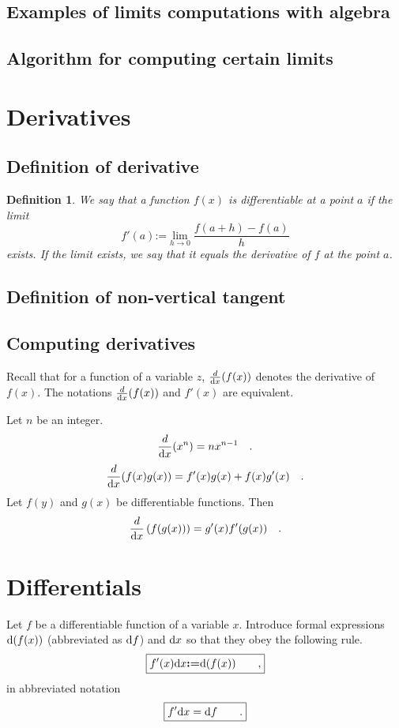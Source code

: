 \documentclass[12pt]{book}
\newcommand{\eqdef}{\textbf{:=}}
\newcommand{\importantFormula}[1]{\begin{equation} \boxed{#1} \end{equation}}
\newtheorem{definition}[theorem]{Definition}
\begin{document}
\subsection{Examples of limits computations with algebra}



\subsection{Algorithm for computing certain limits}


\section{Derivatives}

\subsection{Definition of derivative}\label{secDerivative}
\begin{definition}
We say that a function $f(x)$ is differentiable at a point $a$ if the limit
\begin{equation}\label{eqDefDerivative}
f'(a)\eqdef \lim_{h\to 0} \frac{f(a+h)-f(a)}{h}
\end{equation}
exists. If the limit exists, we say that it equals the derivative of $f$ at the point $a$.
\end{definition}

\subsection{Definition of non-vertical tangent}
\label{secDefTangent}

\subsection{Computing derivatives}
Recall that for a function of a variable $z$, $\frac{d}{{\normalfont \text{d}} x}(f(x))$ denotes the derivative of $f(x)$. The notations $\frac{d}{{\normalfont \text{d}} x}(f(x))$ and $f'(x)$ are equivalent.

Let $n$ be an integer.
\[
\frac{d}{{\normalfont \text{d}} x} (x^n)= n x^{n-1}\quad .
\]
\[
\frac{d}{{\normalfont \text{d}} x} (f(x)g(x)) = f'(x)g(x)+f(x)g'(x) \quad .
\]
Let $f(y)$ and $g(x)$ be differentiable functions.  Then
\[
\frac{d}{{\normalfont \text{d}} x} \left(f( g(x))\right)= g'(x) f'(g(x)) \quad .
\]




\section{Differentials}
Let $f$ be a differentiable function of a variable $x$. Introduce formal expressions ${\normalfont \text{d}}(f(x))$ (abbreviated as ${\normalfont \text{d}} f$) and ${\normalfont \text{d}} x$ so that they obey the following rule.
\importantFormula{
f'(x)\diff x\eqdef \diff(f(x))\quad \quad,
}
in abbreviated notation
\importantFormula{
f'\diff x = \diff f\quad \quad .
}
\end{document}
